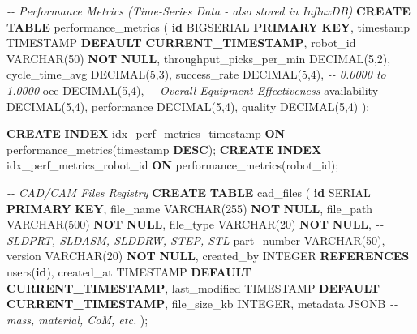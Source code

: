 \documentclass[
]{article}
\newenvironment{Shaded}{\begin{snugshade}}{\end{snugshade}}
\newcommand{\CommentTok}[1]{\textcolor[rgb]{0.56,0.35,0.01}{\textit{#1}}}
\newcommand{\DataTypeTok}[1]{\textcolor[rgb]{0.13,0.29,0.53}{#1}}
\newcommand{\DecValTok}[1]{\textcolor[rgb]{0.00,0.00,0.81}{#1}}
\newcommand{\FunctionTok}[1]{\textcolor[rgb]{0.13,0.29,0.53}{\textbf{#1}}}
\newcommand{\KeywordTok}[1]{\textcolor[rgb]{0.13,0.29,0.53}{\textbf{#1}}}
\newcommand{\NormalTok}[1]{#1}
\begin{document}
\begin{Shaded}
\begin{Highlighting}[]
\CommentTok{{-}{-} Performance Metrics (Time{-}Series Data {-} also stored in InfluxDB)}
\KeywordTok{CREATE} \KeywordTok{TABLE}\NormalTok{ performance\_metrics (}
    \KeywordTok{id}\NormalTok{ BIGSERIAL }\KeywordTok{PRIMARY} \KeywordTok{KEY}\NormalTok{,}
    \DataTypeTok{timestamp} \DataTypeTok{TIMESTAMP} \KeywordTok{DEFAULT} \FunctionTok{CURRENT\_TIMESTAMP}\NormalTok{,}
\NormalTok{    robot\_id }\DataTypeTok{VARCHAR}\NormalTok{(}\DecValTok{50}\NormalTok{) }\KeywordTok{NOT} \KeywordTok{NULL}\NormalTok{,}
\NormalTok{    throughput\_picks\_per\_min }\DataTypeTok{DECIMAL}\NormalTok{(}\DecValTok{5}\NormalTok{,}\DecValTok{2}\NormalTok{),}
\NormalTok{    cycle\_time\_avg }\DataTypeTok{DECIMAL}\NormalTok{(}\DecValTok{5}\NormalTok{,}\DecValTok{3}\NormalTok{),}
\NormalTok{    success\_rate }\DataTypeTok{DECIMAL}\NormalTok{(}\DecValTok{5}\NormalTok{,}\DecValTok{4}\NormalTok{),  }\CommentTok{{-}{-} 0.0000 to 1.0000}
\NormalTok{    oee }\DataTypeTok{DECIMAL}\NormalTok{(}\DecValTok{5}\NormalTok{,}\DecValTok{4}\NormalTok{),  }\CommentTok{{-}{-} Overall Equipment Effectiveness}
\NormalTok{    availability }\DataTypeTok{DECIMAL}\NormalTok{(}\DecValTok{5}\NormalTok{,}\DecValTok{4}\NormalTok{),}
\NormalTok{    performance }\DataTypeTok{DECIMAL}\NormalTok{(}\DecValTok{5}\NormalTok{,}\DecValTok{4}\NormalTok{),}
\NormalTok{    quality }\DataTypeTok{DECIMAL}\NormalTok{(}\DecValTok{5}\NormalTok{,}\DecValTok{4}\NormalTok{)}
\NormalTok{);}

\KeywordTok{CREATE} \KeywordTok{INDEX}\NormalTok{ idx\_perf\_metrics\_timestamp }\KeywordTok{ON}\NormalTok{ performance\_metrics(}\DataTypeTok{timestamp} \KeywordTok{DESC}\NormalTok{);}
\KeywordTok{CREATE} \KeywordTok{INDEX}\NormalTok{ idx\_perf\_metrics\_robot\_id }\KeywordTok{ON}\NormalTok{ performance\_metrics(robot\_id);}

\CommentTok{{-}{-} CAD/CAM Files Registry}
\KeywordTok{CREATE} \KeywordTok{TABLE}\NormalTok{ cad\_files (}
    \KeywordTok{id}\NormalTok{ SERIAL }\KeywordTok{PRIMARY} \KeywordTok{KEY}\NormalTok{,}
\NormalTok{    file\_name }\DataTypeTok{VARCHAR}\NormalTok{(}\DecValTok{255}\NormalTok{) }\KeywordTok{NOT} \KeywordTok{NULL}\NormalTok{,}
\NormalTok{    file\_path }\DataTypeTok{VARCHAR}\NormalTok{(}\DecValTok{500}\NormalTok{) }\KeywordTok{NOT} \KeywordTok{NULL}\NormalTok{,}
\NormalTok{    file\_type }\DataTypeTok{VARCHAR}\NormalTok{(}\DecValTok{20}\NormalTok{) }\KeywordTok{NOT} \KeywordTok{NULL}\NormalTok{,  }\CommentTok{{-}{-} SLDPRT, SLDASM, SLDDRW, STEP, STL}
\NormalTok{    part\_number }\DataTypeTok{VARCHAR}\NormalTok{(}\DecValTok{50}\NormalTok{),}
\NormalTok{    version }\DataTypeTok{VARCHAR}\NormalTok{(}\DecValTok{20}\NormalTok{) }\KeywordTok{NOT} \KeywordTok{NULL}\NormalTok{,}
\NormalTok{    created\_by }\DataTypeTok{INTEGER} \KeywordTok{REFERENCES}\NormalTok{ users(}\KeywordTok{id}\NormalTok{),}
\NormalTok{    created\_at }\DataTypeTok{TIMESTAMP} \KeywordTok{DEFAULT} \FunctionTok{CURRENT\_TIMESTAMP}\NormalTok{,}
\NormalTok{    last\_modified }\DataTypeTok{TIMESTAMP} \KeywordTok{DEFAULT} \FunctionTok{CURRENT\_TIMESTAMP}\NormalTok{,}
\NormalTok{    file\_size\_kb }\DataTypeTok{INTEGER}\NormalTok{,}
\NormalTok{    metadata JSONB  }\CommentTok{{-}{-} mass, material, CoM, etc.}
\NormalTok{);}


\end{Highlighting}
\end{Shaded}
\end{document}
